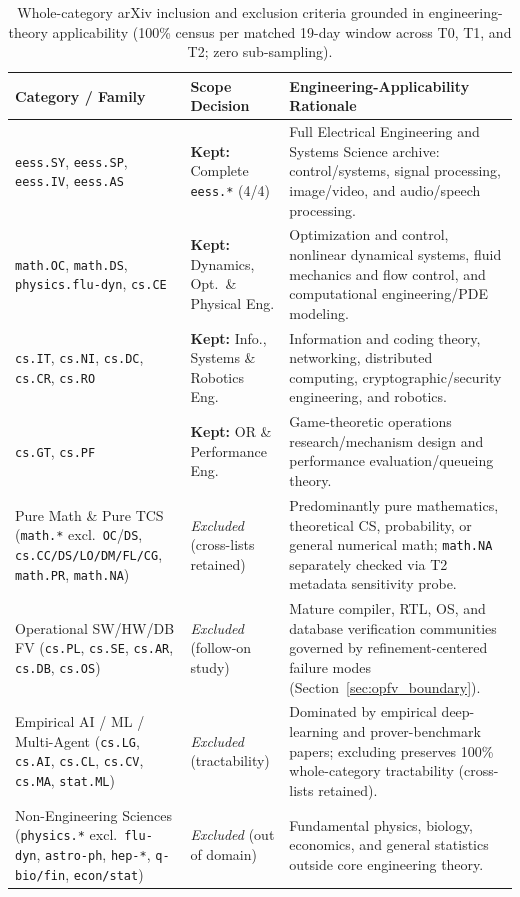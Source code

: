 \documentclass[11pt,letterpaper]{article}
\begin{document}
\begin{table}[!tbp]
\centering
\caption{Whole-category arXiv inclusion and exclusion criteria grounded in engineering-theory applicability (100\% census per matched 19-day window across T0, T1, and T2; zero sub-sampling).}
\label{tab:cat_scope}
\scriptsize
\setlength{\tabcolsep}{3.0pt}
\begin{tabularx}{\textwidth}{@{}>{\raggedright\arraybackslash}p{4.15cm}>{\raggedright\arraybackslash}p{2.35cm}>{\raggedright\arraybackslash}X@{}}
\toprule
\textbf{Category / Family} & \textbf{Scope Decision} & \textbf{Engineering-Applicability Rationale} \\
\midrule
\texttt{eess.SY}, \texttt{eess.SP}, \texttt{eess.IV}, \texttt{eess.AS} & \textbf{Kept:} Complete \texttt{eess.*} (4/4) & Full Electrical Engineering and Systems Science archive: control/systems, signal processing, image/video, and audio/speech processing. \\
\texttt{math.OC}, \texttt{math.DS}, \texttt{physics.flu-dyn}, \texttt{cs.CE} & \textbf{Kept:} Dynamics, Opt.\ \& Physical Eng. & Optimization and control, nonlinear dynamical systems, fluid mechanics and flow control, and computational engineering/PDE modeling. \\
\texttt{cs.IT}, \texttt{cs.NI}, \texttt{cs.DC}, \texttt{cs.CR}, \texttt{cs.RO} & \textbf{Kept:} Info., Systems \& Robotics Eng. & Information and coding theory, networking, distributed computing, cryptographic/security engineering, and robotics. \\
\texttt{cs.GT}, \texttt{cs.PF} & \textbf{Kept:} OR \& Performance Eng. & Game-theoretic operations research/mechanism design and performance evaluation/queueing theory. \\
\midrule
Pure Math \& Pure TCS (\texttt{math.*} excl.\ \texttt{OC}/\texttt{DS}, \texttt{cs.CC/DS/LO/DM/FL/CG}, \texttt{math.PR}, \texttt{math.NA}) & \emph{Excluded} (cross-lists retained) & Predominantly pure mathematics, theoretical CS, probability, or general numerical math; \texttt{math.NA} separately checked via T2 metadata sensitivity probe. \\
Operational SW/HW/DB FV (\texttt{cs.PL}, \texttt{cs.SE}, \texttt{cs.AR}, \texttt{cs.DB}, \texttt{cs.OS}) & \emph{Excluded} (follow-on study) & Mature compiler, RTL, OS, and database verification communities governed by refinement-centered failure modes (Section~\ref{sec:opfv_boundary}). \\
Empirical AI / ML / Multi-Agent (\texttt{cs.LG}, \texttt{cs.AI}, \texttt{cs.CL}, \texttt{cs.CV}, \texttt{cs.MA}, \texttt{stat.ML}) & \emph{Excluded} (tractability) & Dominated by empirical deep-learning and prover-benchmark papers; excluding preserves 100\% whole-category tractability (cross-lists retained). \\
Non-Engineering Sciences (\texttt{physics.*} excl.\ \texttt{flu-dyn}, \texttt{astro-ph}, \texttt{hep-*}, \texttt{q-bio/fin}, \texttt{econ/stat}) & \emph{Excluded} (out of domain) & Fundamental physics, biology, economics, and general statistics outside core engineering theory. \\
\bottomrule
\end{tabularx}
\end{table}
\end{document}
